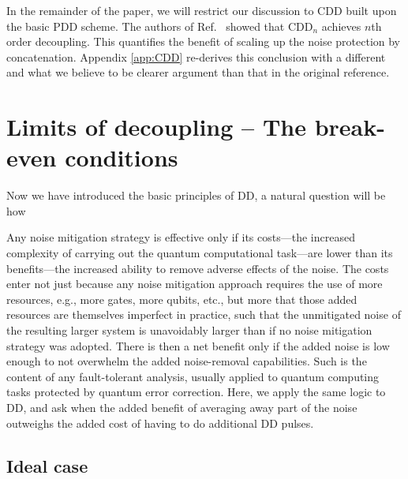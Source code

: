 \documentclass[pra,reprint,superscriptaddress]{revtex4-2}
\newcommand{\CDDn}{\mathrm{CDD}_n}
\begin{document}
In the remainder of the paper, we will restrict our discussion to CDD built upon the basic PDD scheme. The authors of Ref.~\cite{khodjasteh2005fault} showed that $\CDDn$ achieves $n$th order decoupling. This quantifies the benefit of scaling up the noise protection by concatenation. Appendix \ref{app:CDD} re-derives this conclusion with a different and what we believe to be clearer argument than that in the original reference. 





\newpage
\section{Limits of decoupling -- The break-even conditions}
Now we have introduced the basic principles of DD, a natural question will be 
how 


Any noise mitigation strategy is effective only if its costs---the increased complexity of carrying out the quantum computational task---are lower than its benefits---the increased ability to remove adverse effects of the noise. The costs enter not just because any noise mitigation approach requires the use of more resources, e.g., more gates, more qubits, etc., but more that those added resources are themselves imperfect in practice, such that the unmitigated noise of the resulting larger system is unavoidably larger than if no noise mitigation strategy was adopted. There is then a net benefit only if the added noise is low enough to not overwhelm the added noise-removal capabilities. Such is the content of any fault-tolerant analysis, usually applied to quantum computing tasks protected by quantum error correction. Here, we apply the same logic to DD, and ask when the added benefit of averaging away part of the noise outweighs the added cost of having to do additional DD pulses.




\subsection{Ideal case}
\end{document}

